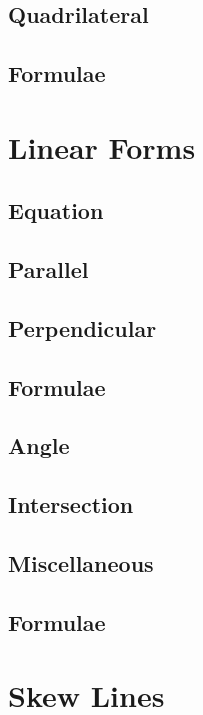 \documentclass[journal]{IEEEtran}
\begin{document}
\subsection{Quadrilateral}

\subsection{Formulae}

\newpage
\section{Linear Forms}
\subsection{Equation }

\subsection{Parallel}

\subsection{Perpendicular}

\subsection{Formulae}

\subsection{Angle}

\subsection{Intersection}

\subsection{Miscellaneous }

\subsection{Formulae}

\newpage
\section{Skew Lines}
\end{document}
